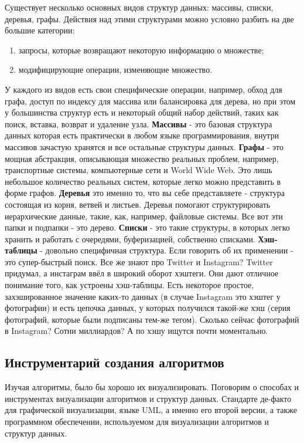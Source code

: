\documentclass[fontsize=14bp]{report}
\begin{document}
Существует несколько основных видов структур данных: массивы, списки, деревья, графы. Действия над этими структурами можно условно разбить на две большие категории: 
\begin{enumerate}
    \item запросы, которые возвращают некоторую информацию о множестве;
    \item модифицирующие операции, изменяющие множество.
\end{enumerate}
У каждого из видов есть свои специфические операции, например, обход для графа, доступ по индексу для массива или балансировка для дерева, но при этом у большинства структур есть и некоторый общий набор действий, таких как поиск, вставка, возврат и удаление узла. \textbf{Массивы} - это базовая структура данных которая есть практически в любом языке программирования, внутри массивов зачастую хранятся и все остальные структуры данных. \textbf{Графы} - это мощная абстракция, описывающая множество реальных проблем, например, транспортные системы, компьютерные сети и World Wide Web. Это лишь небольшое количество реальных систем, которые легко можно представить в форме графов. \textbf{Деревья} это именно то, что вы себе представляете - структура состоящая из корня, ветвей и листьев. Деревья помогают структурировать иерархические данные, такие, как, например, файловые системы. Все вот эти папки и подпапки - это дерево. \textbf{Списки} - это такие структуры, в которых легко хранить и работать с очередями, буферизацией, собственно списками. \textbf{Хэш-таблицы} - довольно специфичная структура. Если говорить об их применении - это супер-быстрый поиск. Все же знают про Twitter и Instagram? Twitter придумал, а инстаграм ввёл в широкий оборот хэштеги. Они дают отличное понимание того, как устроены хэш-таблицы. Есть некоторое простое, захэшированное значение каких-то данных (в случае Instagram это хэштег у фотографии) и есть цепочка данных, у которых получился такой-же хэш (серия фотографий, которые были подписаны тем-же тегом). Сколько сейчас фотографий в Instagram? Сотни миллиардов? А по хэшу ищутся почти моментально.
\subsection{Инструментарий создания алгоритмов}
Изучая алгоритмы, было бы хорошо их визуализировать. Поговорим о способах и инструментах визуализации алгоритмов и структур данных. Стандарте де-факто для графической визуализации, языке UML, а именно его второй версии, а также программном обеспечении, используемом для визуализации алгоритмов и структур данных.
\end{document}
